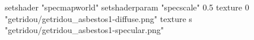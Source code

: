 setshader "specmapworld"
setshaderparam "specscale" 0.5
texture 0 "getridou/getridou_asbestos1-diffuse.png"
texture s "getridou/getridou_asbestos1-specular.png"

